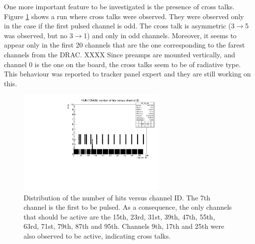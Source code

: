 One more important feature to be investigated is the presence of cross talks. Figure \ref{fig:cross} shows a run where cross talks were observed.
They were observed only in the case if the first pulsed channel is odd. The cross talk is asymmetric (3$\rightarrow$5 was observed, 
but no 3$\rightarrow$1) and only in odd channels.
Moreover, it seems to appear only in the first 20 channels that are the one corresponding to the farest channels from the DRAC. XXXX
Since preamps are mounted vertically, and channel 0 is the one on the board, the cross talks seem to be of radiative type.
This behaviour was reported to tracker panel expert and they are still working on this.
\begin{figure}[!h]
  \centering
  \includegraphics[width=0.65\textwidth]{figures/pdf/run105420_nh_vs_ch.pdf}
  \caption{Distribution of the number of hits versus channel ID. The 7th channel is the first to be pulsed. 
  As a consequence, the only channels that should be active are the 15th, 23rd, 31st, 39th, 47th, 55th, 63rd, 71st, 79th, 87th and 95th. 
  Channels 9th, 17th and 25th were also observed to be active, indicating cross talks.}
 \label{fig:cross}
\end{figure}

